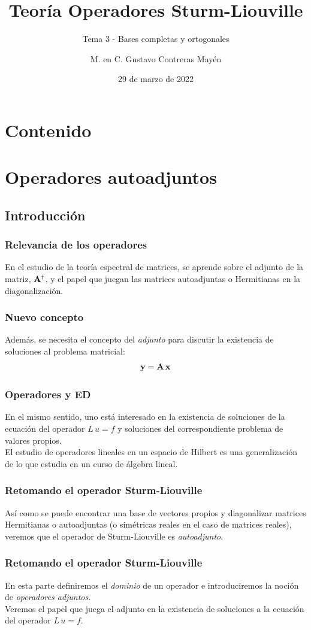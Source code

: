 \documentclass[12pt]{beamer}
\date{29 de marzo de 2022}
\title{\large{Teoría Operadores Sturm-Liouville}}
\subtitle{Tema 3 - Bases completas y ortogonales}
\author{M. en C. Gustavo Contreras Mayén}
\begin{document}
\maketitle
\fontsize{14}{14}\selectfont
{}

\section*{Contenido}

\section{Operadores autoadjuntos}
\subsection{Introducción}

\begin{frame}
\frametitle{Relevancia de los operadores}
En el estudio de la teoría espectral de matrices, se aprende sobre el adjunto de la matriz, $\vb{A}^{\dagger}$, y el papel que juegan las matrices autoadjuntas o Hermitianas en la diagonalización.
\end{frame}
\begin{frame}
\frametitle{Nuevo concepto}
Además, se necesita el concepto del \emph{adjunto} para discutir la existencia de soluciones al problema matricial:
\begin{align*}
\vb{y} = \vb{A} \, \vb{x}
\end{align*}
\end{frame}
\begin{frame}
\frametitle{Operadores y ED}
En el mismo sentido, uno está interesado en la existencia de soluciones de la ecuación del operador $L \, u = f$ y soluciones del correspondiente problema de valores propios.
\\
\bigskip
\pause
El estudio de operadores lineales en un espacio de Hilbert es una generalización de lo que estudia en un curso de álgebra lineal.
\end{frame}
\begin{frame}
\frametitle{Retomando el operador Sturm-Liouville}
Así como se puede encontrar una base de vectores propios y diagonalizar matrices Hermitianas o autoadjuntas (o simétricas reales en el caso de matrices reales), veremos que el operador de Sturm-Liouville es \emph{autoadjunto}.
\end{frame}
\begin{frame}
\frametitle{Retomando el operador Sturm-Liouville}    
En esta parte definiremos el \emph{dominio} de un operador e introduciremos la noción de \emph{operadores adjuntos}.
\\
\bigskip
\pause
Veremos el papel que juega el adjunto en la existencia de soluciones a la ecuación del operador $L \, u = f$.
\end{frame}
\end{document}
